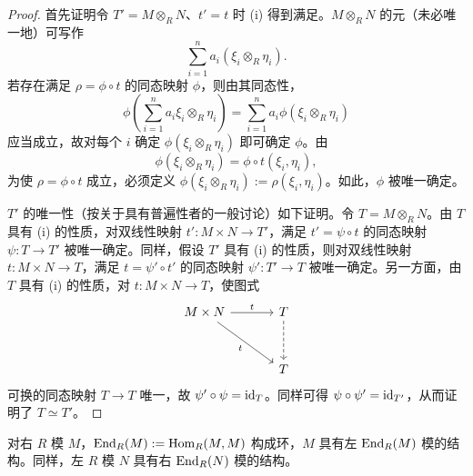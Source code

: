 
\begin{proof}
首先证明令 $T'=M\otimes_R N$、$t'=t$ 时 (i) 得到满足。$M\otimes_R N$ 的元（未必唯一地）可写作
\[
  \sum_{i=1}^n a_i(\xi_i\otimes_R\eta_i).
\]
若存在满足 $\rho=\phi\circ t$ 的同态映射 $\phi$，则由其同态性，
\[
  \phi\left(\sum_{i=1}^n a_i\xi_i\otimes_R\eta_i\right)=\sum_{i=1}^n a_i\phi(\xi_i\otimes_R\eta_i)
\]
应当成立，故对每个 $i$ 确定 $\phi(\xi_i\otimes_R\eta_i)$ 即可确定 $\phi$。由
\[
  \phi(\xi_i\otimes_R\eta_i)=\phi\circ t(\xi_i,\eta_i),
\]
为使 $\rho=\phi\circ t$ 成立，必须定义 $\phi(\xi_i\otimes_R\eta_i):=\rho(\xi_i,\eta_i)$。如此，$\phi$ 被唯一确定。

$T'$ 的唯一性（按关于具有普遍性者的一般讨论）如下证明。令 $T=M\otimes_R N$。由 $T$ 具有 (i) 的性质，对双线性映射 $t'\colon M\times N\to T'$，满足 $t'=\psi\circ t$ 的同态映射 $\psi\colon T\to T'$ 被唯一确定。同样，假设 $T'$ 具有 (i) 的性质，则对双线性映射 $t\colon M\times N\to T$，满足 $t=\psi'\circ t'$ 的同态映射 $\psi'\colon T'\to T$ 被唯一确定。另一方面，由 $T$ 具有 (i) 的性质，对 $t\colon M\times N\to T$，使图式
\[
  \begin{tikzcd}[row sep=3em, column sep=3.4em]
    M\times N \arrow[r, "t"] \arrow[dr, "t"'] & T \arrow[d, dashed] \\
    & T
  \end{tikzcd}
\]
可换的同态映射 $T\to T$ 唯一，故 $\psi'\circ\psi=\mathrm{id}_T$。同样可得 $\psi\circ\psi'=\mathrm{id}_{T'}$，从而证明了 $T\simeq T'$。
\end{proof}


对右 $R$ 模 $M$，$\operatorname{End}_R(M):=\operatorname{Hom}_R(M,M)$ 构成环，$M$ 具有左 $\operatorname{End}_R(M)$ 模的结构。同样，左 $R$ 模 $N$ 具有右 $\operatorname{End}_R(N)$ 模的结构。


